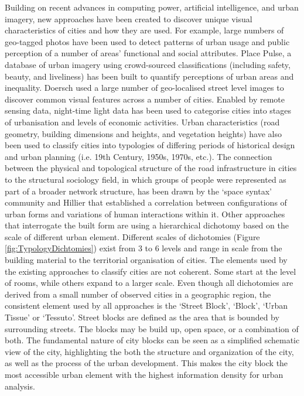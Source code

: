 \documentclass{nature}
\begin{document}
Building on recent advances in computing power, artificial intelligence, and urban imagery, new approaches have been created to discover unique visual characteristics of cities and how they are used. For example, large numbers of geo-tagged photos have been used to detect patterns of urban usage and public perception of a number of areas' functional and social attributes\cite{Liu2016,Zhou2014a}. Place Pulse, a database of urban imagery using crowd-sourced classifications (including safety, beauty, and liveliness) has been built to quantify perceptions of urban areas\cite{Dubey2016,Naik2014} and inequality\cite{Salesses2013}. Doersch\cite{Doersch2012} used a large number of geo-localised street level images to discover common visual features across a number of cities. Enabled by remote sensing data, night-time light data has been used to categorise cities into stages of urbanisation and levels of economic activities\cite{Zhang2013}. Urban characteristics (road geometry, building dimensions and heights, and vegetation heights) have also been used to classify cities into typologies of differing periods of historical design and urban planning (i.e. 19th Century, 1950s, 1970s, etc.)\cite{Hermosilla2014}.
The connection between the physical and topological structure of the road infrastructure in cities to the structural sociology field, in which groups of people were represented as part of a broader network structure, has been drawn by the `space syntax' community and Hillier\cite{Hillier1996} that established a correlation between configurations of urban forms and variations of human interactions within it.  Other approaches that interrogate the built form are using a hierarchical dichotomy based on the scale of different urban element. Different scales of dichotomies (Figure \ref{fig:TypologyDichtomies}) exist from 3 to 6 levels and range in scale from the building material to the territorial organisation of cities\cite{Lynch1981,Conzen1960,Caniggi1979,Castex1980,Mouden1988,Allain2004}. The elements used by the existing approaches to classify cities are not coherent. Some start at the level of rooms, while others expand to a larger scale. Even though all dichotomies are derived from a small number of observed cities in a geographic region, the consistent element used by all approaches is the `Street Block', `Block', `Urban Tissue' or `Tessuto'. Street blocks are defined as the area that is bounded by surrounding streets. The blocks may be build up, open space, or a combination of both. The fundamental nature of city blocks can be seen as a simplified schematic view of the city\cite{Southworth2013}, highlighting the both the structure and organization of the city, as well as the process of the urban development. This makes the city block the most accessible urban element with the highest information density for urban analysis.  
\end{document}
